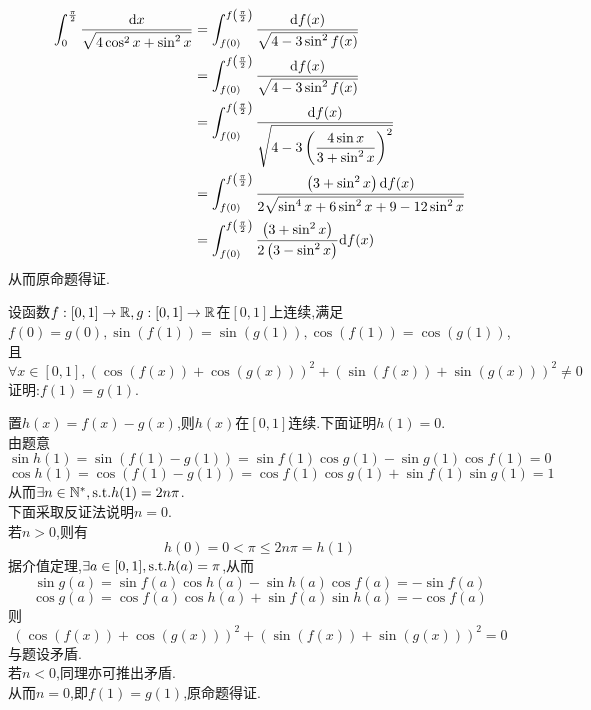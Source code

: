 \documentclass{ctexart}
\begin{document}
\begin{solution}[Solution.]
\begin{enumerate}[label=\textbf{(\arabic*)}]
\begin{align*}
                \int_{0}^{\frac{\pi}{2}}{\dfrac{\mathrm{d} x}{\sqrt{4\cos^2{x}+\sin^2{x}}}}
                &= \int_{f(0)}^{f\left(\frac{\pi}{2}\right)}{\dfrac{\mathrm{d} f(x)}{\sqrt{4-3\sin^2{f(x)}}}} \\
                &= \int_{f(0)}^{f\left(\frac{\pi}{2}\right)}{\dfrac{\mathrm{d} f(x)}{\sqrt{4-3\sin^2{f(x)}}}} \\
                &= \int_{f(0)}^{f\left(\frac{\pi}{2}\right)}{\dfrac{\mathrm{d} f(x)}{\sqrt{4-3\left(\dfrac{4\sin x}{3+\sin^2 x}\right)^2}}} \\
                &= \int_{f(0)}^{f\left(\frac{\pi}{2}\right)}{\dfrac{\left(3+\sin^2 x\right)\mathrm{d} f(x)}{2\sqrt{\sin^4 x+6\sin^2 x+9-12\sin^2 x}}} \\
                &= \int_{f(0)}^{f\left(\frac{\pi}{2}\right)}\dfrac{\left(3+\sin^2 x\right)}{2\left(3-\sin^2 x\right)}\mathrm{d} f(x)
            \end{align*}
            从而原命题得证.
    \end{enumerate}
\end{solution}
\begin{problem}[9.(10分)]
    设函数$f:[0,1]\to\mathbb{R},g:[0,1]\to\mathbb{R}$在$[0,1]$上连续,满足$f(0)=g(0),\sin(f(1))=\sin(g(1)),\cos(f(1))=\cos(g(1))$,且
    $$\forall x\in[0,1],\left(\cos(f(x))+\cos(g(x))\right)^2+\left(\sin(f(x))+\sin(g(x))\right)^2\neq 0$$
    证明:$f(1)=g(1)$.
\end{problem}
\begin{solution}[Proof.]
    置$h(x)=f(x)-g(x)$,则$h(x)$在$[0,1]$连续.下面证明$h(1)=0$.\\
    由题意$$\sin h(1)=\sin \left(f(1)-g(1)\right)=\sin f(1)\cos g(1)-\sin g(1)\cos f(1)=0$$
    $$\cos h(1)=\cos \left(f(1)-g(1)\right)=\cos f(1)\cos g(1)+\sin f(1)\sin g(1)=1$$
    从而$\exists n\in\mathbb{N}^*,\text{s.t.} h(1)=2n\pi$.\\
    下面采取反证法说明$n=0$.\\
    若$n>0$,则有$$h(0)=0<\pi\leqslant 2n\pi=h(1)$$
    据介值定理,$\exists a\in[0,1],\text{s.t.} h(a)=\pi$,从而
    $$\sin g(a)=\sin f(a)\cos h(a)-\sin h(a)\cos f(a)=-\sin f(a)$$
    $$\cos g(a)=\cos f(a)\cos h(a)+\sin f(a)\sin h(a)=-\cos f(a)$$
    则$$\left(\cos(f(x))+\cos(g(x))\right)^2+\left(\sin(f(x))+\sin(g(x))\right)^2=0$$与题设矛盾.\\
    若$n<0$,同理亦可推出矛盾.\\
    从而$n=0$,即$f(1)=g(1)$,原命题得证.
\end{solution}
\end{document}
